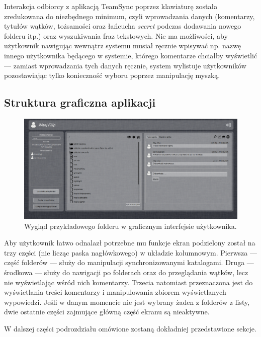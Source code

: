 \documentclass[polish,a4paper,twoside]{ppfcmthesis}
\begin{document}
Interakcja odbiorcy z aplikacją TeamSync poprzez klawiaturę została zredukowana do niezbędnego minimum, czyli wprowadzania danych (komentarzy, tytułów wątków, tożsamości oraz łańcucha \emph{secret} podczas dodawania nowego folderu itp.) oraz wyszukiwania fraz tekstowych. Nie ma możliwości, aby użytkownik nawigując wewnątrz systemu musiał ręcznie wpisywać np. nazwę innego użytkownika będącego w systemie, którego komentarze chciałby wyświetlić --- zamiast wprowadzania tych danych ręcznie, system wylistuje użytkowników pozostawiając tylko konieczność wyboru poprzez manipulację myszką.

\subsection*{Struktura graficzna aplikacji}

\begin{figure}[htb]
  \vspace{5pt}
  \begin{center}
    \includegraphics[width=400pt]{figures/filescomments.png}
  \end{center}
  \caption{Wygląd przykładowego folderu w graficznym interfejsie użytkownika.}
\end{figure}

Aby użytkownik łatwo odnalazł potrzebne mu funkcje ekran podzielony został na trzy części (nie licząc paska nagłówkowego) w układzie kolumnowym. Pierwsza --- część folderów --- służy do manipulacji synchronizowanymi katalogami. Druga --- środkowa --- służy do nawigacji po folderach oraz do przeglądania wątków, lecz nie wyświetlając wśród nich komentarzy. Trzecia natomiast przeznaczona jest do wyświetlania treści komentarzy i manipulowania zbiorem wyświetlanych wypowiedzi. Jeśli w danym momencie nie jest wybrany żaden z folderów z listy, dwie ostatnie części zajmujące główną część ekranu są nieaktywne.

W dalszej części podrozdziału omówione zostaną dokładniej przedstawione sekcje.
\end{document}
